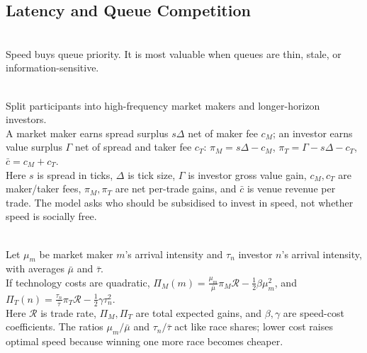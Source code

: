\subsection{Latency and Queue Competition}

\begin{principle} \\
Speed buys queue priority. It is most valuable when queues are thin, stale, or information-sensitive.
\end{principle}

\begin{model} \\
Split participants into high-frequency market makers and longer-horizon investors.\\
A market maker earns spread surplus $s\Delta$ net of maker fee $c_M$; an investor earns value surplus $\Gamma$ net of spread and taker fee $c_T$: $\pi_M=s\Delta-c_M$, $\pi_T=\Gamma-s\Delta-c_T$, $\bar{c}=c_M+c_T$.\\
Here $s$ is spread in ticks, $\Delta$ is tick size, $\Gamma$ is investor gross value gain, $c_M,c_T$ are maker/taker fees, $\pi_M,\pi_T$ are net per-trade gains, and $\bar{c}$ is venue revenue per trade. The model asks who should be subsidised to invest in speed, not whether speed is socially free.
\end{model}

\begin{mechanism} \\
Let $\mu_m$ be market maker $m$'s arrival intensity and $\tau_n$ investor $n$'s arrival intensity, with averages $\bar{\mu}$ and $\bar{\tau}$.\\
If technology costs are quadratic, $\Pi_M(m)=\frac{\mu_m}{\bar{\mu}}\pi_M\mathcal{R}-\frac{1}{2}\beta\mu_m^2$, and $\Pi_T(n)=\frac{\tau_n}{\bar{\tau}}\pi_T\mathcal{R}-\frac{1}{2}\gamma\tau_n^2$.\\
Here $\mathcal{R}$ is trade rate, $\Pi_M,\Pi_T$ are total expected gains, and $\beta,\gamma$ are speed-cost coefficients. The ratios $\mu_m/\bar{\mu}$ and $\tau_n/\bar{\tau}$ act like race shares; lower cost raises optimal speed because winning one more race becomes cheaper.
\end{mechanism}

